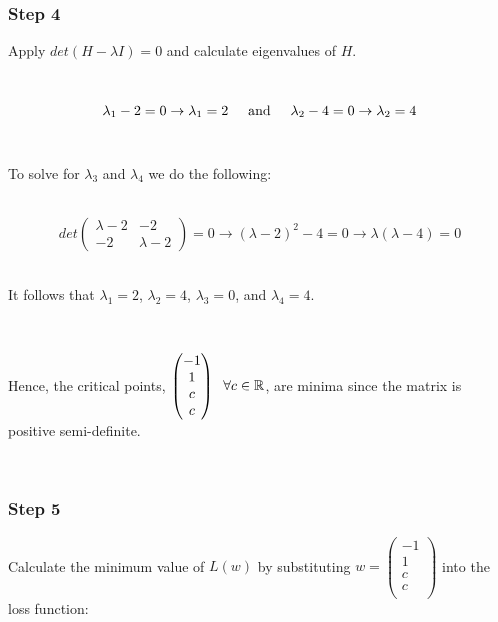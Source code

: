 \documentclass{article}
\begin{document}
\subsubsection*{Step 4}
\parbox{\textwidth}{Apply $det(H-\lambda I)=0$ and calculate eigenvalues of $H$.
}\\

$$
\lambda_1 -2 = 0 \rightarrow \lambda_1 = 2 \hspace{0.5cm} \text{and} \hspace{0.5cm} \lambda_2 -4 = 0 \rightarrow \lambda_2 = 4
$$\\

\parbox{\textwidth}{To solve for $\lambda_3$ and $\lambda_4$ we do the following:
}\\

$$
det
  \begin{pmatrix}
    \lambda -2 & -2 \\
   -2 & \lambda - 2 
  \end{pmatrix}= 0
\rightarrow (\lambda-2)^2 - 4 =0 \rightarrow \lambda(\lambda-4) = 0
$$\\

\parbox{\textwidth}{It follows that $\lambda_1 = 2$, $\lambda_2 = 4$, $\lambda_3 = 0$, and $\lambda_4 = 4$.
}\\

\parbox{\textwidth}{
Hence, the critical points,
$\begin{pmatrix}
  -1 \\
   1 \\
   c \\
   c \\
\end{pmatrix}
\hspace{0.2cm} \forall c \in \mathbb{R}
$, are minima since the matrix is positive semi-definite.
}\\

\subsubsection*{Step 5}
\parbox{\textwidth}{
Calculate the minimum value of $L(w)$ by substituting $w = \begin{pmatrix}
  -1 \\
   1 \\
   c \\
   c \\
\end{pmatrix}$ into the loss function:
}\\
\end{document}
